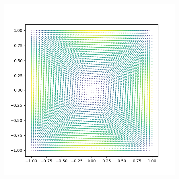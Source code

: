 \documentclass[handout]{beamer}
\begin{document}
\begin{frame}
\begin{figure}[h]
\begin{subfigure}{.48\textwidth}
      \includegraphics[width=\textwidth]{figures/wind.png}
    \end{subfigure}
  \end{figure}
\end{frame}
\end{document}
